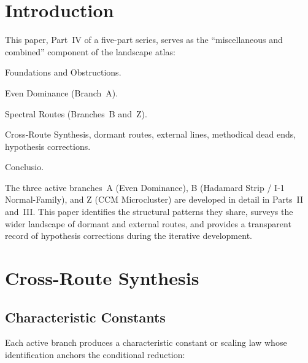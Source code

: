 \documentclass[12pt,a4paper]{article}
\theoremstyle{definition}
\theoremstyle{remark}
\begin{document}
\section{Introduction}
\label{sec:intro}

This paper, Part~IV of a five-part series, serves as the ``miscellaneous
and combined'' component of the landscape atlas:
\begin{description}[font=\bfseries,leftmargin=2em]
  \item[Part~I \cite{Geiger2026partI}:] Foundations and Obstructions.
  \item[Part~II \cite{Geiger2026partII}:] Even Dominance (Branch~A).
  \item[Part~III \cite{Geiger2026partIII}:] Spectral Routes
    (Branches~B and~Z).
  \item[Part~IV (this paper):] Cross-Route Synthesis, dormant routes,
    external lines, methodical dead ends, hypothesis corrections.
  \item[Part~V \cite{Geiger2026partV}:] Conclusio.
\end{description}

The three active branches~A (Even Dominance), B (Hadamard Strip / I-1
Normal-Family), and Z (CCM Microcluster) are developed in detail in
Parts~II and~III. This paper identifies the structural patterns they
share, surveys the wider landscape of dormant and external routes, and
provides a transparent record of hypothesis corrections during the
iterative development.


\section{Cross-Route Synthesis}
\label{sec:cross-route}

\subsection{Characteristic Constants}

Each active branch produces a characteristic constant or scaling law
whose identification anchors the conditional reduction:
\end{document}
